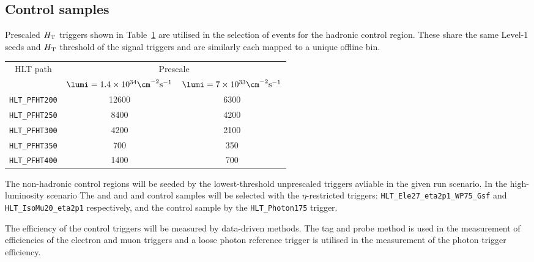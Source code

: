\subsection{Control samples\label{sec:control_samples}}
Prescaled $\mbox{$H_\text{T}$}$ triggers shown in Table~\ref{tab:2015_Hadronic_Control_Triggers} are utilised in the selection of events for the hadronic control region. These share the same Level-1 seeds and $\mbox{$H_\text{T}$}$ threshold of the signal triggers and are similarly each mapped to a unique offline bin. 


\begin{table}[h!]
\footnotesize
\centering
\begin{tabular}{c|cc} 
\hline
\hline
HLT path & \multicolumn{2}{c}{Prescale} \\
         & $\lumi=1.4\times10^{34}\cm^{-2}{\rm s}^{-1}$  & $\lumi=7\times10^{33}\cm^{-2}{\rm s}^{-1}$     \\
\hline
\verb!HLT_PFHT200! & 12600 & 6300 \\
\verb!HLT_PFHT250! & 8400  & 4200 \\
\verb!HLT_PFHT300! & 4200  & 2100 \\
\verb!HLT_PFHT350! & 700   & 350  \\
\verb!HLT_PFHT400! & 1400  & 700  \\
\hline
\hline

\end{tabular}
\label{tab:2015_Hadronic_Control_Triggers}
\end{table}


The non-hadronic control regions will be seeded by the lowest-threshold unprescaled 
triggers avliable in the given run scenario. In the high-luminosity scenario The \ej 
and \eej and \mj and \mmj control samples will be selected with the $\eta$-restricted 
triggers: \verb!HLT_Ele27_eta2p1_WP75_Gsf! and \verb!HLT_IsoMu20_eta2p1! respectively,
and the \gj control sample by the \verb!HLT_Photon175! trigger. 

The efficiency of the control triggers will be measured by data-driven methods. The tag 
and probe method is used in the measurement of efficiencies of the electron and muon triggers 
and a loose photon reference trigger is utilised in the measurement of the photon trigger
efficiency.




